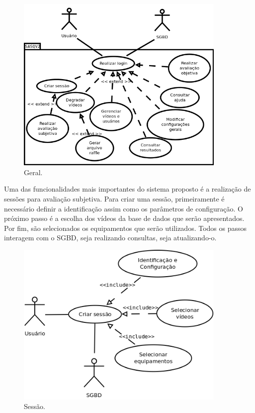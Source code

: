 \begin{figure}[!htb]
	\centering
	\includegraphics[width=0.9\textwidth]{./diagramas/casodeuso2.png}
	\caption{Geral.}
	\label{fig:ucdgeral}
\end{figure}

Uma das funcionalidades mais importantes do sistema proposto é a realização de sessões para avaliação subjetiva. Para criar uma sessão, primeiramente é necessário definir a identificação assim como os parâmetros de configuração. O próximo passo é a escolha dos vídeos da base de dados que serão apresentados. Por fim, são selecionados os equipamentos que serão utilizados. Todos os passos interagem com o SGBD, seja realizando consultas, seja atualizando-o.

\begin{figure}[!htb]
	\centering
	\includegraphics[width=0.9\textwidth]{./diagramas/sessao.png}
	\caption{Sessão.}
	\label{fig:ucdsessao}
\end{figure}

